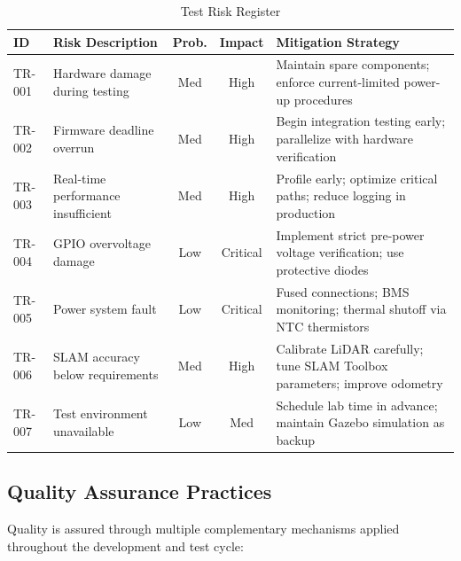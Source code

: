 \begin{table}[H]
    \centering
    \caption{Test Risk Register}
    \label{tab:test_risks}
    \begin{tabular}{@{}lp{3cm}ccp{4cm}@{}}
        \toprule
        \textbf{ID} & \textbf{Risk Description} & \textbf{Prob.} & \textbf{Impact} & \textbf{Mitigation Strategy} \\
        \midrule
        TR-001 & Hardware damage during testing & Med & High & Maintain spare components; enforce current-limited power-up procedures \\
        TR-002 & Firmware deadline overrun & Med & High & Begin integration testing early; parallelize with hardware verification \\
        TR-003 & Real-time performance insufficient & Med & High & Profile early; optimize critical paths; reduce logging in production \\
        TR-004 & GPIO overvoltage damage & Low & Critical & Implement strict pre-power voltage verification; use protective diodes \\
        TR-005 & Power system fault & Low & Critical & Fused connections; BMS monitoring; thermal shutoff via NTC thermistors \\
        TR-006 & SLAM accuracy below requirements & Med & High & Calibrate LiDAR carefully; tune SLAM Toolbox parameters; improve odometry \\
        TR-007 & Test environment unavailable & Low & Med & Schedule lab time in advance; maintain Gazebo simulation as backup \\
        \bottomrule
    \end{tabular}
\end{table}

\subsection{Quality Assurance Practices}

Quality is assured through multiple complementary mechanisms applied throughout the development and test cycle:

